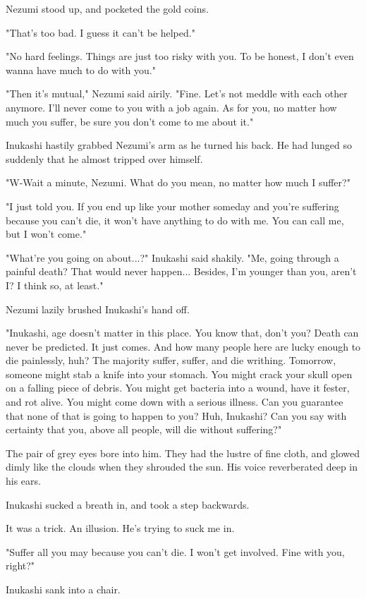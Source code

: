 Nezumi stood up, and pocketed the gold coins.

"That's too bad. I guess it can't be helped."

"No hard feelings. Things are just too risky with you. To be honest, I
don't even wanna have much to do with you."

"Then it's mutual," Nezumi said airily. "Fine. Let's not meddle with
each other anymore. I'll never come to you with a job again. As for you,
no matter how much you suffer, be sure you don't come to me about it."

Inukashi hastily grabbed Nezumi's arm as he turned his back. He had
lunged so suddenly that he almost tripped over himself.

"W-Wait a minute, Nezumi. What do you mean, no matter how much I
suffer?"

"I just told you. If you end up like your mother someday and you're
suffering because you can't die, it won't have anything to do with me.
You can call me, but I won't come."

"What're you going on about...?" Inukashi said shakily. "Me, going
through a painful death? That would never happen... Besides, I'm younger
than you, aren't I? I think so, at least."

Nezumi lazily brushed Inukashi's hand off.

"Inukashi, age doesn't matter in this place. You know that, don't you?
Death can never be predicted. It just comes. And how many people here
are lucky enough to die painlessly, huh? The majority suffer, suffer,
and die writhing. Tomorrow, someone might stab a knife into your
stomach. You might crack your skull open on a falling piece of debris.
You might get bacteria into a wound, have it fester, and rot alive. You
might come down with a serious illness. Can you guarantee that none of
that is going to happen to you? Huh, Inukashi? Can you say with
certainty that you, above all people, will die without suffering?"

The pair of grey eyes bore into him. They had the lustre of fine cloth,
and glowed dimly like the clouds when they shrouded the sun. His voice
reverberated deep in his ears.

Inukashi sucked a breath in, and took a step backwards.

It was a trick. An illusion. He's trying to suck me in.

"Suffer all you may because you can't die. I won't get involved. Fine
with you, right?"

Inukashi sank into a chair.

